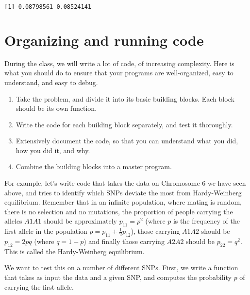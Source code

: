 \documentclass[
  letterpaper,
  DIV=11,
  numbers=noendperiod]{scrreprt}
\providecommand{\tightlist}{%
  \setlength{\itemsep}{0pt}\setlength{\parskip}{0pt}}\usepackage{longtable,booktabs,array}
\begin{document}
\begin{verbatim}
[1] 0.08798561 0.08524141
\end{verbatim}

\hypertarget{organizing-and-running-code}{%
\section{Organizing and running
code}\label{organizing-and-running-code}}

During the class, we will write a lot of code, of increasing complexity.
Here is what you should do to ensure that your programs are
well-organized, easy to understand, and easy to debug.

\begin{enumerate}
\def\labelenumi{\arabic{enumi}.}
\tightlist
\item
  Take the problem, and divide it into its basic building blocks. Each
  block should be its own function.
\item
  Write the code for each building block separately, and test it
  thoroughly.
\item
  Extensively document the code, so that you can understand what you
  did, how you did it, and why.
\item
  Combine the building blocks into a master program.
\end{enumerate}

For example, let's write code that takes the data on Chromosome 6 we
have seen above, and tries to identify which SNPs deviate the most from
Hardy-Weinberg equilibrium. Remember that in an infinite population,
where mating is random, there is no selection and no mutations, the
proportion of people carrying the alleles \(A1A1\) should be
approximately \(p_{11} = p^2\) (where \(p\) is the frequency of the
first allele in the population \(p = p_{11} + \frac{1}{2} p_{12}\)),
those carrying \(A1A2\) should be \(p_{12} = 2 p q\) (where \(q = 1-p\))
and finally those carrying \(A2A2\) should be \(p_{22} = q^2\). This is
called the Hardy-Weinberg equilibrium.

We want to test this on a number of different SNPs. First, we write a
function that takes as input the data and a given SNP, and computes the
probability \(p\) of carrying the first allele.
\end{document}
